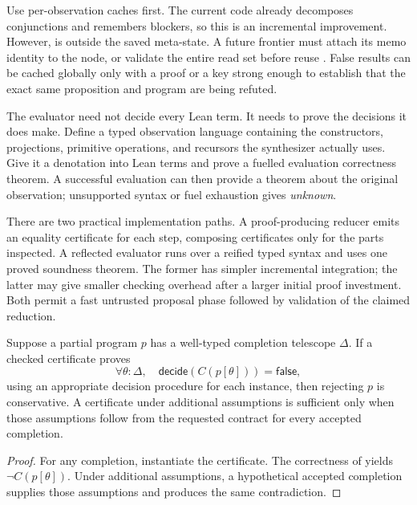 Use per-observation caches first. The current code already decomposes
conjunctions and remembers blockers, so this is an incremental improvement.
However,  is outside the saved meta-state. A future
frontier must attach its memo identity to the node, or validate the entire
read set before reuse \cite{searchcode,transactioncode}. False results can be
cached globally only with a proof or a key strong enough to establish that
the exact same proposition and program are being refuted.


The evaluator need not decide every Lean term. It needs to prove the decisions
it does make. Define a typed observation language containing the constructors,
projections, primitive operations, and recursors the synthesizer actually
uses. Give it a denotation into Lean terms and prove a fuelled evaluation
correctness theorem. A successful evaluation can then provide a theorem about
the original observation; unsupported syntax or fuel exhaustion gives
\emph{unknown}.

There are two practical implementation paths. A proof-producing reducer emits
an equality certificate for each step, composing certificates only for the
parts inspected. A reflected evaluator runs over a reified typed syntax and
uses one proved soundness theorem. The former has simpler incremental
integration; the latter may give smaller checking overhead after a larger
initial proof investment. Both permit a fast untrusted proposal phase followed
by validation of the claimed reduction.

\begin{proposition}\label{prop:eval}
Suppose a partial program $p$ has a well-typed completion telescope $\Delta$.
If a checked certificate proves
\[
 \forall\theta:\Delta,\quad
 \mathsf{decide}(C(p[\theta]))=\mathsf{false},
\]
using an appropriate decision procedure for each instance, then rejecting $p$
is conservative. A certificate under additional assumptions is sufficient only
when those assumptions follow from the requested contract for every accepted
completion.
\end{proposition}
\begin{proof}
For any completion, instantiate the certificate. The correctness of
 yields $\neg C(p[\theta])$. Under additional assumptions, a
hypothetical accepted completion supplies those assumptions and produces the
same contradiction.
\end{proof}

